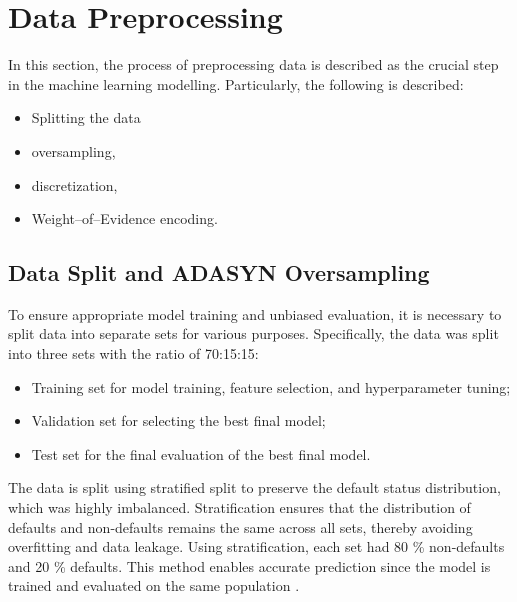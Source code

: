         
        \section{Data Preprocessing}
        In this section, the process of preprocessing data is described as the crucial step in the machine learning modelling. Particularly, the following is described:
        \begin{itemize}\setlength\itemsep{0em}
            \item Splitting the data
            \item oversampling,
            \item discretization,
            \item Weight--of--Evidence encoding.
        \end{itemize}
        
        
        \subsection{Data Split and ADASYN Oversampling}
        \label{subsec:data-split-ADASYN}
        
        To ensure appropriate model training and unbiased evaluation, it is necessary to split data into separate sets for various purposes. Specifically, the data was split into three sets with the ratio of 70:15:15:
        \begin{itemize}\setlength\itemsep{0em} 
            \item Training set for model training, feature selection, and hyperparameter tuning;
            \item Validation set for selecting the best final model;
            \item Test set for the final evaluation of the best final model.
        \end{itemize}
        
        The data is split using stratified split to preserve the default status distribution, which was highly imbalanced.
        Stratification ensures that the distribution of defaults and non-defaults remains the same across all sets, thereby avoiding overfitting and data leakage. Using stratification, each set had 80 \% non-defaults and 20 \% defaults. This method enables accurate prediction since the model is trained and evaluated on the same population \citep{igareta2021strat}.
        
